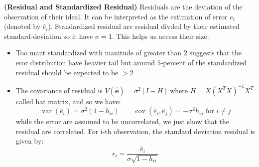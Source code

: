 \begin{remark}{\textbf{(Residual and Standardized Residual)}}
    Residuals are the deviation of the observation of their ideal. It can be interpreted as the estimation of error $e_i$ (denoted by $\hat{e}_i$). Standardized residual are residual divded by their estimated standard-deviation so it have $\sigma = 1$. This helps us access their size. 
    \begin{itemize}
        \item Too mant standardized with manitude of greater than $2$ suggests that the eror distribution have heavier tail but around $5$-percent of the standardized residual should be expected to be $>2$
        \item The covariance of residual is $V(\hat{\boldsymbol e}) = \sigma^2[I - H]$ where $H = X(X^TX)^{-1}X^T$ called hat matrix, and so we have:
        \begin{equation*}
            \operatorname{var}(\hat{e}_i) = \sigma^2(1-h_{ii}) \qquad \operatorname{cov}(\hat{e}_i, \hat{e}_j) = -\sigma^2h_{ij} \text{ for } i \ne j
        \end{equation*}
        while the error are assumed to be uncorrelated, we just show that the residual are correlated. For i-th observation, the standard deviation residual is given by:
        \begin{equation*}
            r_i = \frac{\hat{e}_i}{\sigma\sqrt{1-h_{ii}}}
        \end{equation*}
    \end{itemize}
\end{remark}

